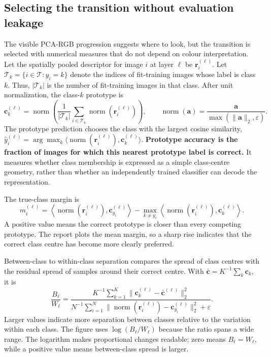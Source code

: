 \subsection{Selecting the transition without evaluation leakage}
\label{subsec:pca-transition-selection}

The visible PCA-RGB progression suggests where to look, but the transition is
selected with numerical measures that do not depend on colour interpretation.
Let the spatially pooled descriptor for image $i$ at layer $\ell$ be
$\bm r_i^{(\ell)}$. Let
$\mathcal T_k=\{i\in\mathcal T:y_i=k\}$ denote the indices of fit-training
images whose label is class $k$. Thus, $|\mathcal T_k|$ is the number of
fit-training images in that class. After unit normalization, the class-$k$
prototype is
\begin{equation}
    \bm c_k^{(\ell)}
    =
    \operatorname{norm}
    \left(
        \frac{1}{|\mathcal T_k|}
        \sum_{i\in\mathcal T_k}
        \operatorname{norm}(\bm r_i^{(\ell)})
    \right),
    \qquad
    \operatorname{norm}(\bm a)=\frac{\bm a}{\max(\|\bm a\|_2,\varepsilon)}.
    \label{eq:pca-class-prototype}
\end{equation}
The prototype prediction chooses the class with the largest cosine similarity,
$\hat y_i^{(\ell)}=\arg\max_k\langle
\operatorname{norm}(\bm r_i^{(\ell)}),\bm c_k^{(\ell)}\rangle$.
\textbf{Prototype accuracy is the fraction of images for which this nearest
prototype label is correct.} It measures whether class membership is expressed
as a simple class-centre geometry, rather than whether an independently trained
classifier can decode the representation.

The true-class margin is
\begin{equation}
    m_i^{(\ell)}
    =
    \left\langle\operatorname{norm}(\bm r_i^{(\ell)}),
    \bm c_{y_i}^{(\ell)}\right\rangle
    -
    \max_{k\ne y_i}
    \left\langle\operatorname{norm}(\bm r_i^{(\ell)}),
    \bm c_k^{(\ell)}\right\rangle .
    \label{eq:pca-true-class-margin}
\end{equation}
A positive value means the correct prototype is closer than every competing
prototype. The report plots the mean margin, so a sharp rise indicates that the
correct class centre has become more clearly preferred.

Between-class to within-class separation compares the spread of class centres
with the residual spread of samples around their correct centre. With
$\bar{\bm c}=K^{-1}\sum_k\bm c_k$, it is
\begin{equation}
    \frac{B_\ell}{W_\ell}
    =
    \frac{
        K^{-1}\sum_{k=1}^{K}\|\bm c_k^{(\ell)}-\bar{\bm c}^{(\ell)}\|_2^2
    }{
        N^{-1}\sum_{i=1}^{N}
        \|\operatorname{norm}(\bm r_i^{(\ell)})-\bm c_{y_i}^{(\ell)}\|_2^2
        +\varepsilon
    }.
    \label{eq:pca-bw-separation}
\end{equation}
Larger values indicate more separation between classes relative to the
variation within each class. The figure uses $\log(B_\ell/W_\ell)$ because the
ratio spans a wide range. The logarithm makes proportional changes readable;
zero means $B_\ell=W_\ell$, while a positive value means between-class spread
is larger.

